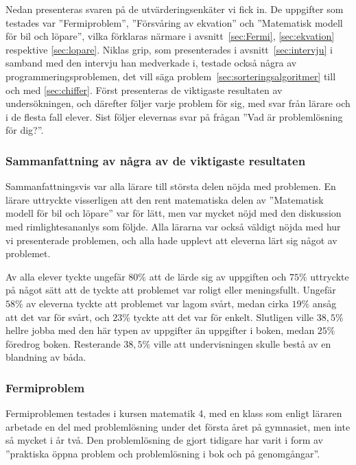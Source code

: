 \textcolor{lila}{Nedan presenteras svaren på de utvärderingsenkäter vi fick in. De uppgifter som testades var ''Fermiproblem'', ''Försvåring av ekvation'' och ''Matematisk modell för bil och löpare'', vilka förklaras närmare i avsnitt~\ref{sec:Fermi}, \ref{sec:ekvation} respektive \ref{sec:lopare}. Niklas grip, som presenterades i avsnitt~\ref{sec:intervju} i samband med den intervju han medverkade i, testade också några av programmeringsproblemen, det vill säga problem~\ref{sec:sorteringsalgoritmer} till och med \ref{sec:chiffer}. Först presenteras de viktigaste resultaten av undersökningen, och därefter följer varje problem för sig, med svar från lärare och i de flesta fall elever. Sist följer elevernas svar på frågan ''Vad är problemlösning för dig?''.}

\subsubsection{Sammanfattning av några av de viktigaste resultaten}
    \textcolor{lila}{Sammanfattningsvis var alla lärare till största delen nöjda med problemen. En lärare uttryckte visserligen att den rent matematiska delen av ''Matematisk modell för bil och löpare'' var för lätt, men var mycket nöjd med den diskussion med rimlightesananlys som följde. Alla lärarna var också väldigt nöjda med hur vi presenterade problemen, och alla hade upplevt att eleverna lärt sig något av problemet.}
    
    \textcolor{lila}{Av alla elever tyckte ungefär $80\%$ att de lärde sig av uppgiften och $75\%$ uttryckte på något sätt att de tyckte att problemet var roligt eller meningsfullt. Ungefär $58\%$ av eleverna tyckte att problemet var lagom svårt, medan cirka $19\%$ ansåg att det var för svårt, och $23\%$ tyckte att det var för enkelt. Slutligen ville $38,5\%$ hellre jobba med den här typen av uppgifter än uppgifter i boken, medan $25\%$ föredrog boken. Resterande $38,5\%$ ville att undervisningen skulle bestå av en blandning av båda.}
    
    
    \subsubsection{Fermiproblem}
        \label{resutat:Fermi}
        \textcolor{lila}{Fermiproblemen testades i kursen matematik 4, med en klass som enligt läraren arbetade en del med problemlösning under det första året på gymnasiet, men inte så mycket i år två. Den problemlösning de gjort tidigare har varit i form av ''praktiska öppna problem och problemlösning i bok och på genomgångar''.}
        
